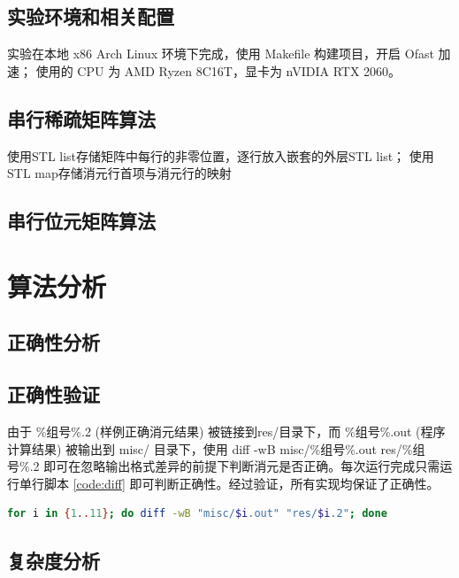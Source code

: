 \documentclass[a4paper]{article}
\begin{document}
\subsection{实验环境和相关配置}
实验在本地 x86 Arch Linux 环境下完成，使用 Makefile 构建项目，开启 Ofast 加速；
使用的 CPU 为 AMD Ryzen 8C16T，显卡为 nVIDIA RTX 2060。

\subsection{串行稀疏矩阵算法}
使用STL list存储矩阵中每行的非零位置，逐行放入嵌套的外层STL list；
使用STL map存储消元行首项与消元行的映射

\subsection{串行位元矩阵算法}


\section{算法分析}
\subsection{正确性分析}

\subsection{正确性验证}
由于 \%组号\%.2 (样例正确消元结果) 被链接到res/目录下，而 \%组号\%.out (程序计算结果) 被输出到 misc/ 目录下，使用 diff -wB misc/\%组号\%.out res/\%组号\%.2 即可在忽略输出格式差异的前提下判断消元是否正确。每次运行完成只需运行单行脚本 \ref{code:diff} 即可判断正确性。经过验证，所有实现均保证了正确性。
\begin{lstlisting}[frame=trbl, language={bash}, caption={单行 Bash 脚本}, label = {code:diff}]
  for i in {1..11}; do diff -wB "misc/$i.out" "res/$i.2"; done
\end{lstlisting}

\subsection{复杂度分析}
\end{document}
